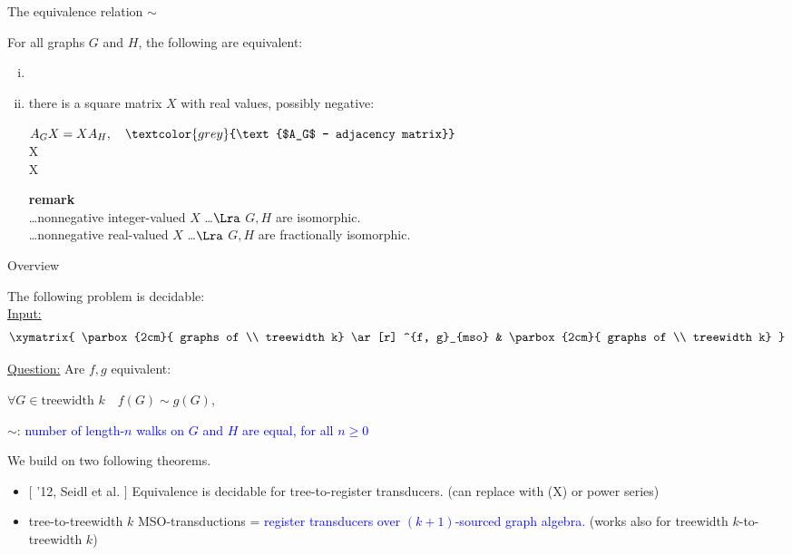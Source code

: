 \begin{frame}{The equivalence relation $\sim$}
\begin{tw}
	For all graphs $G$ and $H$, the following are equivalent: 
	\begin{enumerate}[(i)]
		\item {}
		\item
		there is a square matrix $X$ with real values, possibly negative:
			\begin{center}
				$A_GX = XA_H, \quad \textcolor{grey}{\text{$A_G$ -- adjacency matrix}}$\\
				\hspace{-1.6cm} X \\
				\hspace{-1.1cm} X 
			\end{center}
		\pause
		 \textbf{remark}\\
		\ldots nonnegative integer-valued $X$ \ldots $\Lra$ $G, H$ are isomorphic.\\
		\pause
		\ldots nonnegative real-valued $X$ \ldots  $\Lra$ $G, H$ are fractionally isomorphic.
		\pause
	\end{enumerate}
\end{tw}
\end{frame}
\begin{frame}{Overview}
\begin{tw} The following problem is decidable:\\
	\underline{Input:}
	$$
	\xymatrix{
		\parbox{2cm}{
		graphs of \\ treewidth k}	\ar[r] ^{f, g}_{mso} &	\parbox{2cm}{
		graphs of \\ treewidth k}	
	}
	$$
	
	\underline{Question:} Are $f,g$ equivalent:
	
	$\forall G \in \text{treewidth } k \quad f(G) \sim g(G)$,
	
	$\sim$: \textcolor{blue}{number of length-$n$ walks on $G$ and $H$ are equal, for all $n \geq 0$}
\end{tw}
\pause
We build on two following theorems.\\
\pause
\begin{itemize}
	\item 
	$\lbrack$ '12, Seidl et al. $\rbrack$ Equivalence is decidable for tree-to-\Q register transducers. (can replace \Q with \Q(X) or power series) \pause \\
	\item
	tree-to-treewidth $k$ MSO-transductions = \textcolor{blue}{ register transducers over $(k+1)$-sourced graph algebra.} (works also for treewidth $k$-to-treewidth $k$)
\end{itemize}
\end{frame}


